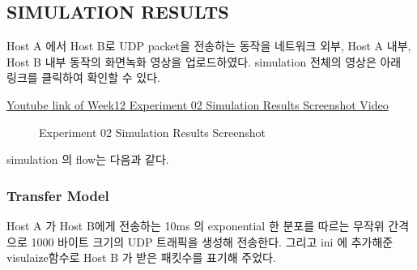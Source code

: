 \subsection*{SIMULATION RESULTS}
    \vspace{-1mm}
    Host A 에서 Host B로 UDP packet을 전송하는 동작을 네트워크 외부, Host A 내부, Host B 내부 동작의 화면녹화 영상을 업로드하였다.
    simulation 전체의 영상은 아래 링크를 클릭하여 확인할 수 있다.     
    \vspace{-10mm}
        \begin{center}
            \item \href{https://youtu.be/N8wHft9a8jM}
        	{Youtube link of Week12 Experiment 02 Simulation Results Screenshot Video}
        \end{center}
    \vspace{-6mm}
        \begin{figure}[h!]
        \centering
        \hspace{3mm}
        \caption{Experiment 02 Simulation Results Screenshot}
        \vspace{-2mm}
        \end{figure}
    
    simulation 의 flow는 다음과 같다. 
\vspace{-3mm}
    \subsubsection*{Transfer Model }
    \vspace{-2mm}
    Host A 가 Host B에게 전송하는 10ms 의 exponential 한 분포를 따르는 무작위 간격으로 1000 바이트 크기의 UDP 트래픽을 생성해 전송한다.  그리고 ini 에 추가해준 visulaize함수로 Host B 가 받은 패킷수를 표기해 주었다. 
\vspace{-1mm}
